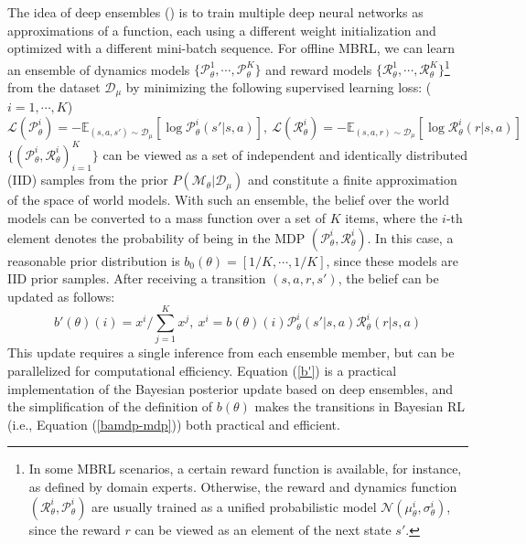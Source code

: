 The idea of deep ensembles (\cite{DBLP:conf/nips/Lakshminarayanan17}) is to train multiple deep neural networks as approximations of a function, each using a different weight initialization and optimized with a different mini-batch sequence. For offline MBRL, we can learn an ensemble of dynamics models $\{\mathcal{P}_{\theta}^1, \cdots, \mathcal{P}_{\theta}^K\}$ and reward models $\{\mathcal{R}_{\theta}^1, \cdots, \mathcal{R}_{\theta}^K\}$\footnote{In some MBRL scenarios, a certain reward function is available, for instance, as defined by domain experts. Otherwise, the reward and dynamics function $(\mathcal{R}_\theta^i, \mathcal{P}_\theta^i)$ are usually trained as a unified probabilistic model $\mathcal{N}(\mu_{\theta}^i, \sigma_{\theta}^i)$, since the reward $r$ can be viewed as an element of the next state $s'$.} from the dataset $\mathcal{D}_\mu$ by minimizing the following supervised learning loss: ($i = 1, \cdots, K$)
\begin{equation}
    \mathcal{L}(\mathcal{P}_{\theta}^i) = -\mathbb{E}_{(s, a, s') \sim \mathcal{D}_\mu} \left[\log \mathcal{P}_{\theta}^i(s'|s, a)\right],\ \mathcal{L}(\mathcal{R}_{\theta}^i) = -\mathbb{E}_{(s, a, r) \sim \mathcal{D}_\mu} \left[\log \mathcal{R}_{\theta}^i(r|s, a)\right]
\end{equation}
$\{(\mathcal{P}_{\theta}^i, \mathcal{R}_{\theta}^i)_{i=1}^K\}$ can be viewed as a set of independent and identically distributed (IID) samples from the prior $P(\mathcal{M}_\theta | \mathcal{D}_\mu)$ and constitute a finite approximation of the space of world models. With such an ensemble, the belief over the world models can be converted to a mass function over a set of $K$ items, where the $i$-th element denotes the probability of being in the MDP $(\mathcal{P}_{\theta}^i, \mathcal{R}_{\theta}^i)$. In this case, a reasonable prior distribution is $b_0(\theta) = [1/K, \cdots, 1/K]$, since these models are IID prior samples. After receiving a transition $(s, a, r, s')$, the belief can be updated as follows:
\begin{equation} \label{b'}
    b'(\theta)(i) = x^i / \sum_{j=1}^K x^j,\ x^i = b(\theta)(i)\mathcal{P}_\theta^i(s' | s, a) \mathcal{R}_\theta^i(r | s, a)
\end{equation}
This update requires a single inference from each ensemble member, but can be parallelized for computational efficiency. Equation (\ref{b'}) is a practical implementation of the Bayesian posterior update based on deep ensembles, and the simplification of the definition of $b(\theta)$ makes the transitions in Bayesian RL (i.e., Equation (\ref{bamdp-mdp})) both practical and efficient.

